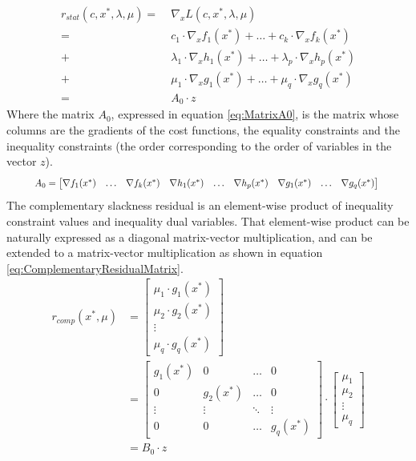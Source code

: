 \documentclass[12pt, a4paper]{article}
\begin{document}
\begin{equation} \label{eq:StationarityResidualMatrix}
\begin{aligned}
    r_{stat}(c, x^*, \lambda, \mu) =& \; \nabla_x L(c, x^*, \lambda, \mu) \\
    =& \; c_1 \cdot \nabla_x f_1(x^*) + \ldots + c_k \cdot \nabla_x f_k(x^*) \\
    +& \; \lambda_1 \cdot \nabla_x h_1(x^*) + \ldots + \lambda_p \cdot \nabla_x h_p(x^*)  \\
    +& \; \mu_1 \cdot \nabla_x g_1(x^*) + \ldots + \mu_q \cdot \nabla_x g_q(x^*)\\
    =& \; A_0 \cdot z
\end{aligned}
\end{equation}
Where the matrix \( A_0 \), expressed in equation \eqref{eq:MatrixA0}, is the matrix whose columns are the gradients of the cost functions, the equality constraints and the inequality constraints (the order corresponding to the order of variables in the vector \( z\)).
\begin{equation} \label{eq:MatrixA0}
\resizebox{0.9\hsize}{!}{$
A_0 = 
    \begin{bmatrix}
    \nabla f_1(x^*) & \ldots & \nabla f_k(x^*) & \nabla h_1(x^*)  & \ldots & \nabla h_p(x^*) & \nabla g_1(x^*) & \ldots & \nabla g_q(x^*)
    \end{bmatrix}
$
}
\end{equation}
The complementary slackness residual is an element-wise product of inequality constraint values and inequality dual variables. That element-wise product can be naturally expressed as a diagonal matrix-vector multiplication, and can be extended to a matrix-vector multiplication  as shown in equation \eqref{eq:ComplementaryResidualMatrix}.
\begin{equation} \label{eq:ComplementaryResidualMatrix}
\begin{split}
    r_{comp}(x^*, \mu) &= 
    \begin{bmatrix}
    \mu_1 \cdot g_1(x^*)\\
    \mu_2 \cdot g_2(x^*)\\
    \vdots\\
    \mu_q \cdot g_q(x^*)
    \end{bmatrix}\\
    &= \begin{bmatrix}
    g_1(x^*) & 0 & \dots & 0 \\
    0 & g_2(x^*) & \ldots & 0 \\
    \vdots & \vdots & \ddots & \vdots \\
    0 & 0 & \ldots & g_q(x^*)
    \end{bmatrix}
    \cdot 
    \begin{bmatrix}
    \mu_1 \\
    \mu_2 \\
    \vdots \\
    \mu_q
    \end{bmatrix}
    \\
    &= B_0 \cdot z
\end{split}
\end{equation}
\end{document}
